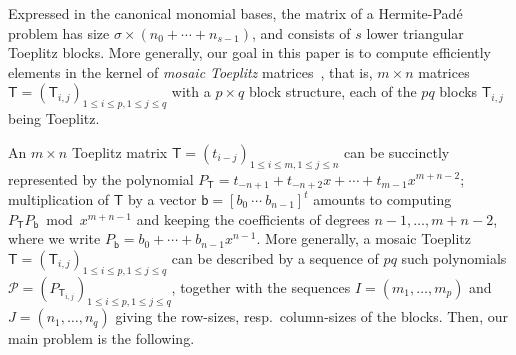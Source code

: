 \documentclass{sig-alternate}
\newcommand{\vb}{\ensuremath{\mathsf{b}}}
\newcommand{\mT}{\ensuremath{\mathsf{T}}}
\begin{document}
Expressed in the canonical monomial bases, the matrix of a
Hermite-Pad\'e problem has size $\sigma \times (n_0 + \cdots +
n_{s-1})$, and consists of $s$ lower triangular Toeplitz blocks. More
generally, our goal in this paper is to compute efficiently elements
in the kernel of {\em mosaic Toeplitz} matrices~\cite{HeAm88}, that
is, $m \times n$ matrices $\mT=(\mT_{i,j})_{1 \le i \le p,1 \le j \le
  q}$ with a $p \times q$ block structure, each of the $pq$ blocks $\mT_{i,j}$
being Toeplitz.

An $m \times n$ Toeplitz matrix $\mT=(t_{i-j})_{1\le i \le m, 1 \le j
  \le n}$ can be succinctly represented by the polynomial
$P_\mT=t_{-n+1} + t_{-n+2} x + \cdots + t_{m-1} x^{m+n-2}$;
multiplication of $\mT$ by a vector $\vb=[b_0~\cdots~b_{n-1}]^t$
amounts to computing $P_\mT P_\vb \bmod x^{m+n-1}$ and keeping the
coefficients of degrees $n-1,\dots,m+n-2$, where we write $P_\vb=b_0 +
\cdots + b_{n-1} x^{n-1}$.  More generally, a mosaic Toeplitz
$\mT=(\mT_{i,j})_{1 \le i \le p,1 \le j \le q}$ can be described by a
sequence of $pq$ such polynomials $\mathscr{P}=(P_{\mT_{i,j}})_{1 \le
  i \le p,1 \le j \le q}$, together with the sequences
$I=(m_1,\dots,m_p)$ and $J=(n_1,\dots,n_q)$ giving the row-sizes,
resp.\ column-sizes of the blocks. Then, our main problem is the
following.
\end{document}
